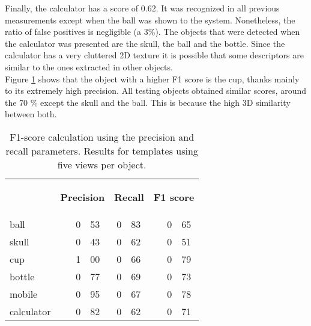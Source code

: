 	Finally, the calculator has a score of 0.62. 
	It was recognized in all previous measurements except when the ball was shown to the system. 
	Nonetheless, the ratio of false positives is negligible (a 3\%). 
	The objects that were detected when the calculator was presented are the skull, the ball and the bottle. 
	Since the calculator has a very cluttered 2D texture it is possible that some descriptors are similar to the ones extracted in other objects. 
	\\

	Figure \ref{5views_fscore} shows that the object with a higher F1 score is the cup, thanks mainly to its extremely high precision.  
	All testing objects obtained similar scores, around the 70 \% except the skull and the ball. 
	This is because the high 3D similarity between both. 

\begin{table}[H]
\centering
\begin{tabular} {l l r@{.}l r@{.}l l r@{.}l }
\toprule
\addlinespace[3mm]
   \multicolumn{1}{c}{\begin{center}\textbf{Object}\end{center}} &
   \multicolumn{3}{c}{\begin{center}\textbf{Precision}\end{center}} &
   \multicolumn{2}{c}{\begin{center}\textbf{Recall}\end{center}} &
   \multicolumn{3}{c}{\begin{center}\hspace*{0.2cm}\textbf{F1 score}\end{center}} &\\
\addlinespace[-3mm]

\midrule
ball		&&	0&53 	&	0&83	&&	0&65	\\
skull		&&	0&43	&	0&62	&&	0&51	\\
cup			&&	1&00	&	0&66	&&	0&79	\\
bottle		&&	0&77	&	0&69	&&	0&73	\\
mobile		&&	0&95	&	0&67	&&	0&78	\\
calculator	&&	0&82	&	0&62	&&	0&71	\\


\bottomrule
\end{tabular}
\caption[F1-score - templates using 5 views]{F1-score calculation using the precision and recall parameters. Results for templates using five views per object. }
\label{5views_fscore}
\end{table}




